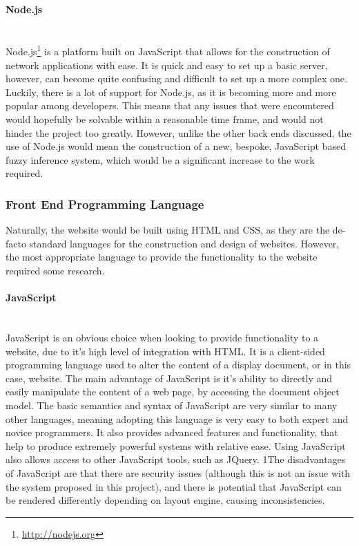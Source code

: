 \paragraph{Node.js}\ \\
Node.js\footnote{\url{http://nodejs.org}} is a platform built on JavaScript that allows for the construction of network applications with ease. It is quick and easy to set up a basic server, however, can become quite confusing and difficult to set up a more complex one. Luckily, there is a lot of support for Node.js, as it is becoming more and more popular among developers. This means that any issues that were encountered would hopefully be solvable within a reasonable time frame, and would not hinder the project too greatly. However, unlike the other back ends discussed, the use of Node.js would mean the construction of a new, bespoke, JavaScript based fuzzy inference system, which would be a significant increase to the work required. 

\subsubsection{Front End Programming Language}
Naturally, the website would be built using HTML and CSS, as they are the de-facto standard languages for the construction and design of websites. However, the most appropriate language to provide the functionality to the website required some research. 

\paragraph{JavaScript}\ \\
JavaScript is an obvious choice when looking to provide functionality to a website, due to it's high level of integration with HTML. It is a client-sided programming language used to alter the content of a display document, or in this case, website. The main advantage of JavaScript is it's ability to directly and easily manipulate the content of a web page, by accessing the document object model. The basic semantics and syntax of JavaScript are very similar to many other languages, meaning adopting this language is very easy to both expert and novice programmers. It also provides advanced features and functionality, that help to produce extremely powerful systems with relative ease. Using JavaScript also allows access to other JavaScript tools, such as JQuery. 1The disadvantages of JavaScript are that there are security issues (although this is not an issue with the system proposed in this project), and there is potential that JavaScript can be rendered differently depending on layout engine, causing inconsistencies.

